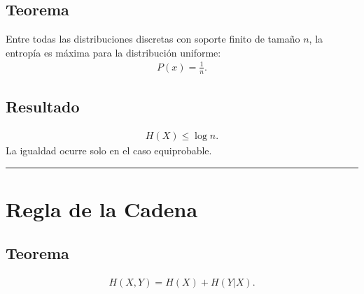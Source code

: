 \documentclass[letterpaper,10pt,english]{jupyterBook}
\begin{document}
\subsection{Teorema}
\label{\detokenize{02_mathematical_foundations/properties_theorems:id1}}
\sphinxAtStartPar
Entre todas las distribuciones discretas con soporte finito de tamaño \(n\),
la entropía es máxima para la distribución uniforme:
\begin{equation*}
\begin{split}
P(x)=\frac{1}{n}.
\end{split}
\end{equation*}

\subsection{Resultado}
\label{\detokenize{02_mathematical_foundations/properties_theorems:resultado}}\begin{equation*}
\begin{split}
H(X)\le \log n.
\end{split}
\end{equation*}
\sphinxAtStartPar
La igualdad ocurre solo en el caso equiprobable.


\bigskip\hrule\bigskip



\section{Regla de la Cadena}
\label{\detokenize{02_mathematical_foundations/properties_theorems:regla-de-la-cadena}}

\subsection{Teorema}
\label{\detokenize{02_mathematical_foundations/properties_theorems:id2}}\begin{equation*}
\begin{split}
H(X,Y)=H(X)+H(Y|X).
\end{split}
\end{equation*}
\end{document}
